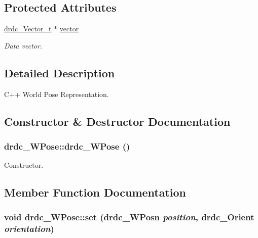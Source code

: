 \subsection*{Protected Attributes}
\begin{CompactItemize}
\item 
\hyperlink{structdrdc__Vector__t}{drdc\_\-Vector\_\-t} $\ast$ \hyperlink{classdrdc__WPose_b02d1988175a6268511d4e13d0702508}{vector}
\begin{CompactList}\small\item\em Data vector. \item\end{CompactList}\end{CompactItemize}


\subsection{Detailed Description}
C++ World Pose Representation. 



\subsection{Constructor \& Destructor Documentation}
\hypertarget{classdrdc__WPose_6514c2fd83bf9c7cb73bd4f1e984125b}{
\subsubsection[drdc\_\-WPose]{\setlength{\rightskip}{0pt plus 5cm}drdc\_\-WPose::drdc\_\-WPose ()}}
\label{classdrdc__WPose_6514c2fd83bf9c7cb73bd4f1e984125b}


Constructor. 



\subsection{Member Function Documentation}
\hypertarget{classdrdc__WPose_e64d64f0464aa320c73d3bea00bfd645}{
\subsubsection[set]{\setlength{\rightskip}{0pt plus 5cm}void drdc\_\-WPose::set ({\bf drdc\_\-WPosn} {\em position}, \/  {\bf drdc\_\-Orient} {\em orientation})}}
\label{classdrdc__WPose_e64d64f0464aa320c73d3bea00bfd645}


